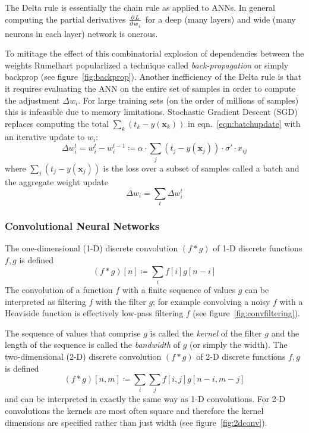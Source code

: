 The Delta rule is essentially the chain rule as applied to ANNs.
%
In general computing the partial derivatives \(\pd{L}{w_i}\) for a deep (many layers) and wide (many neurons in each layer) network is onerous.
%

To mititage the effect of this combinatorial explosion of dependencies between the weights Rumelhart \etal\cite{rumelhart1988learning} popularlized a technique called \textit{back-propagation} or simply backprop (see figure~\ref{fig:backprop}).
%
Another inefficiency of the Delta rule is that it requires evaluating the ANN on the entire set of samples in order to compute the adjustment \(\Delta w_i\).
%
For large training sets (on the order of millions of samples) this is infeasible due to memory limitations.
%
Stochastic Gradient Descent (SGD) replaces computing the total \(\sum_k(t_k-y(\mathbf{x}_k))\) in eqn.~\eqref{eqn:batchupdate} with an iterative update to \(w_i\):
\begin{equation}
    \Delta w_i^t = w_i^t - w_i^{t-1} \coloneqq \alpha \cdot \sum_j (t_j-y(\mathbf{x}_j))\cdot \sigma'\cdot x_{ij}
    \label{eqn:sgd}
\end{equation}
where \(\sum_j (t_j-y(\mathbf{x}_j))\) is the loss over a subset of samples called a batch and the aggregate weight update
\begin{equation}
    \Delta w_i = \sum_t \Delta w_i^t
\end{equation}
%
\subsubsection{Convolutional Neural Networks}
The one-dimensional (1-D) discrete convolution \((f*g)\) of 1-D discrete functions \(f,g\) is defined
\begin{equation}
    (f*g)[n]\coloneqq \sum _{i} f[i]g[n-i]
    \label{eqn:1dconv}
\end{equation}
The convolution of a function \(f\) with a finite sequence of values \(g\) can be interpreted as filtering \(f\) with the filter \(g\); for example convolving a noisy \(f\) with a Heaviside function is effectively low-pass filtering \(f\) (see figure~\ref{fig:convfiltering}).

%
The sequence of values that comprise \(g\) is called the \textit{kernel} of the filter \(g\) and the length of the sequence is called the \textit{bandwidth} of \(g\) (or simply the width).
%
The two-dimensional (2-D) discrete convolution \((f*g)\) of 2-D discrete functions \(f,g\) is defined
\begin{equation}
    (f*g)[n, m]\coloneqq \sum _{i}\sum _{j}f[i, j]g[n-i, m-j]
    \label{eqn:2dconv}
\end{equation}
and can be interpreted in exactly the same way as 1-D convolutions.
%
For 2-D convolutions the kernels are most often square and therefore the kernel dimensions are specified rather than just width (see figure~\ref{fig:2dconv}).


